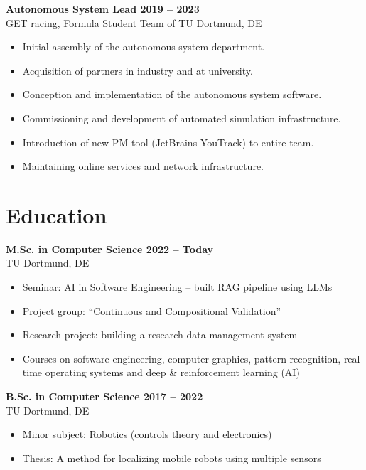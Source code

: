 \documentclass[a4paper,11pt]{article}
\newcommand{\col}[2]{\textcolor[HTML]{#1}{#2}}
\begin{document}
\begin{minipage}[t]{0.65\textwidth}
    \vspace{0.2cm}

    \textbf{\col{a68573}{Autonomous System Lead \hfill 2019 -- 2023}} \\
    GET racing, Formula Student Team of TU Dortmund, DE
    \begin{itemize}
        \small
        \item Initial assembly of the autonomous system department.
        \item Acquisition of partners in industry and at university.
        \item Conception and implementation of the autonomous system software.
        \item Commissioning and development of automated simulation infrastructure.
        \item Introduction of new PM tool (JetBrains YouTrack) to entire team.
        \item Maintaining online services and network infrastructure.
    \end{itemize}

    \section*{\col{908587}{Education}}
    \col{91878a}{\textbf{M.Sc. in Computer Science \hfill 2022 -- Today}} \\
    TU Dortmund, DE
    \begin{itemize}
        \small
        \item Seminar: AI in Software Engineering -- built RAG pipeline using LLMs
        \item Project group: \enquote{Continuous and Compositional Validation}
        \item Research project: building a research data management system
        \item Courses on software engineering, computer graphics, pattern recognition, real time operating systems and deep \& reinforcement learning (AI)
    \end{itemize}

    \vspace{0.2cm}

    \col{81879c}{\textbf{B.Sc. in Computer Science \hfill 2017 -- 2022}} \\
    TU Dortmund, DE
    \begin{itemize}
        \small
        \item Minor subject: Robotics (controls theory and electronics)
        \item Thesis: A method for localizing mobile robots using multiple sensors
    \end{itemize}


\end{minipage}
\end{document}

